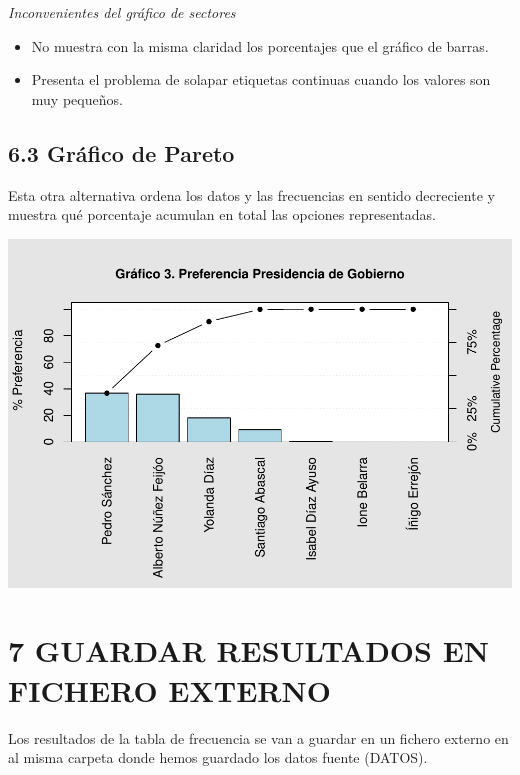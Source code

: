 \documentclass[
  12 pt,
  a4paper,
]{article}
\begin{document}
\emph{Inconvenientes del gráfico de sectores}

\begin{itemize}
\item
  No muestra con la misma claridad los porcentajes que el gráfico de
  barras.
\item
  Presenta el problema de solapar etiquetas continuas cuando los valores
  son muy pequeños.
\end{itemize}

\hypertarget{gruxe1fico-de-pareto}{%
\subsection{6.3 Gráfico de Pareto}\label{gruxe1fico-de-pareto}}

Esta otra alternativa ordena los datos y las frecuencias en sentido
decreciente y muestra qué porcentaje acumulan en total las opciones
representadas.

\includegraphics{preferenciaPte_files/figure-latex/graficoPareto-1.pdf}

\newpage

\hypertarget{guardar-resultados-en-fichero-externo}{%
\section{7 GUARDAR RESULTADOS EN FICHERO
EXTERNO}\label{guardar-resultados-en-fichero-externo}}

Los resultados de la tabla de frecuencia se van a guardar en un fichero
externo en al misma carpeta donde hemos guardado los datos fuente
(DATOS).
\end{document}
